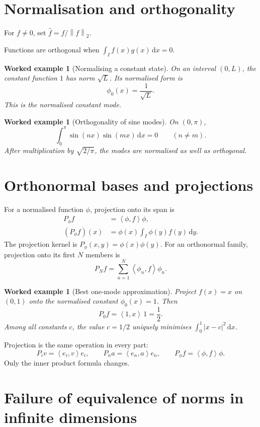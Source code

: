 \documentclass[11pt,a5paper,oneside,openany]{scrreprt}
\theoremstyle{notes}
\theoremstyle{definitions}
\newtheorem{example}[theorem]{Worked example}
\newcommand{\ip}[2]{\left\langle #1,#2\right\rangle}
\newcommand{\norm}[1]{\left\lVert #1\right\rVert}
\newcommand{\dd}{\,\mathrm{d}}
\begin{document}
\section{Normalisation and orthogonality}

For $f\ne0$, set $\widehat f=f/\norm{f}_2$.

Functions are orthogonal when $\int_If(x)g(x)\dd x=0$.

\begin{example}[Normalising a constant state]
On an interval $(0,L)$, the constant function $1$ has norm $\sqrt L$.  Its
normalised form is
\[
  \phi_0(x)=\frac1{\sqrt L}.
\]
This is the normalised constant mode.
\end{example}

\begin{example}[Orthogonality of sine modes]
On $(0,\pi)$,
\[
 \int_0^\pi\sin(nx)\sin(mx)\dd x=0\qquad(n\ne m).
\]
After multiplication by $\sqrt{2/\pi}$, the modes are normalised as well as
orthogonal.
\end{example}

\section{Orthonormal bases and projections}

For a normalised function $\phi$, projection onto its span is
\[
\begin{aligned}
 P_\phi f&=\ip{\phi}{f}\phi,\\
 (P_\phi f)(x)&=\phi(x)\int_I\phi(y)f(y)\dd y.
\end{aligned}
\]
The projection kernel is $P_\phi(x,y)=\phi(x)\phi(y)$.
For an orthonormal family, projection onto its first $N$ members is
\[
 P_Nf=\sum_{n=1}^{N}\ip{\phi_n}{f}\phi_n.
\]

\begin{example}[Best one-mode approximation]
Project $f(x)=x$ on $(0,1)$ onto the normalised constant $\phi_0(x)=1$.
Then
\[
 P_0f=\ip{1}{x}\,1=\frac12.
\]
Among all constants $c$, the value $c=1/2$ uniquely minimises
$\int_0^1|x-c|^2\dd x$.
\end{example}

\begin{bridge}
Projection is the same operation in every part:
\[
 P_iv=\ip{e_i}{v}e_i,
 \qquad
 P_na=\ip{e_n}{a}e_n,
 \qquad
 P_\phi f=\ip{\phi}{f}\phi.
\]
Only the inner product formula changes.
\end{bridge}

\section{Failure of equivalence of norms in infinite dimensions}
\end{document}
